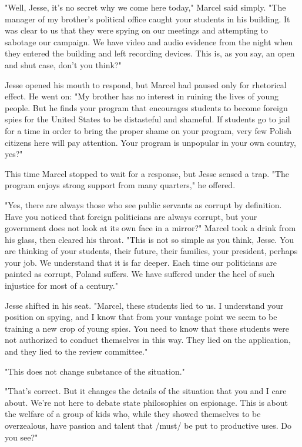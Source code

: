 "Well, Jesse, it's no secret why we come here today," Marcel said simply.  "The manager of my brother's political office caught your students in his building.  It was clear to us that they were spying on our meetings and attempting to sabotage our campaign.  We have video and audio evidence from the night when they entered the building and left recording devices.  This is, as you say, an open and shut case, don't you think?"

Jesse opened his mouth to respond, but Marcel had paused only for rhetorical effect.  He went on: "My brother has no interest in ruining the lives of young people.  But he finds your program that encourages students to become foreign spies for the United States to be distasteful and shameful.  If students go to jail for a time in order to bring the proper shame on your program, very few Polish citizens here will pay attention.  Your program is unpopular in your own country, yes?"

This time Marcel stopped to wait for a response, but Jesse sensed a trap.  "The program enjoys strong support from many quarters," he offered.

"Yes, there are always those who see public servants as corrupt by definition.  Have you noticed that foreign politicians are always corrupt, but your government does not look at its own face in a mirror?"  Marcel took a drink from his glass, then cleared his throat.  "This is not so simple as you think, Jesse.  You are thinking of your students, their future, their families, your president, perhaps your job.  We understand that it is far deeper.  Each time our politicians are painted as corrupt, Poland suffers.  We have suffered under the heel of such injustice for most of a century."

Jesse shifted in his seat.  "Marcel, these students lied to us.  I understand your position on spying, and I know that from your vantage point we seem to be training a new crop of young spies.  You need to know that these students were not authorized to conduct themselves in this way.  They lied on the application, and they lied to the review committee."

"This does not change substance of the situation."

"That's correct.  But it changes the details of the situation that you and I care about.  We're not here to debate state philosophies on espionage.  This is about the welfare of a group of kids who, while they showed themselves to be overzealous, have passion and talent that /must/ be put to productive uses.  Do you see?"

